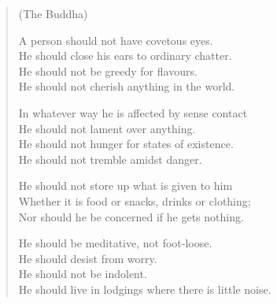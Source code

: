 \begin{verse}

(The Buddha)

 A person should not have covetous eyes.\\
He should close his ears to ordinary chatter.\\
He should not be greedy for flavours.\\
He should not cherish anything in the world.


 In whatever way he is affected by sense contact\\
He should not lament over anything.\\
He should not hunger for states of existence.\\
He should not tremble amidst danger.


 He should not store up what is given to him\\
Whether it is food or snacks, drinks or clothing;\\
Nor should he be concerned if he gets nothing.


 He should be meditative, not foot-loose.\\
He should desist from worry.\\
He should not be indolent.\\
He should live in lodgings where there is little noise.



\end{verse}
